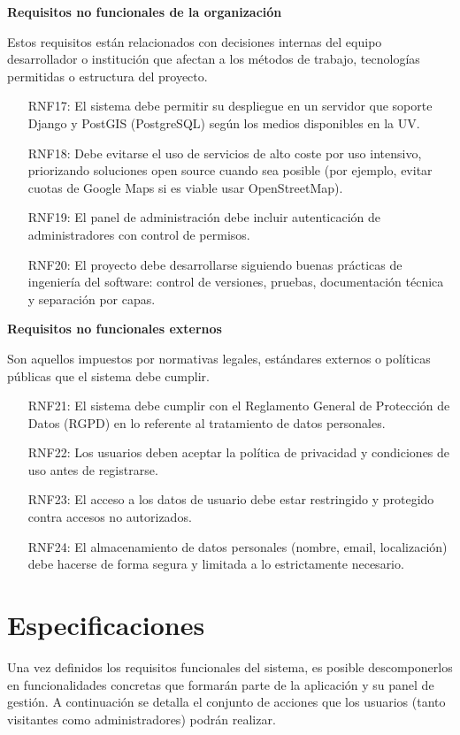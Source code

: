 \textbf{Requisitos no funcionales de la organización}

Estos requisitos están relacionados con decisiones internas del equipo desarrollador o institución que afectan a los métodos de trabajo, tecnologías permitidas o estructura del proyecto.

\begin{itemize}
    \item[RNF17:] El sistema debe permitir su despliegue en un servidor que soporte Django y PostGIS (PostgreSQL) según los medios disponibles en la UV.
    \item[RNF18:] Debe evitarse el uso de servicios de alto coste por uso intensivo, priorizando soluciones open source cuando sea posible (por ejemplo, evitar cuotas de Google Maps si es viable usar OpenStreetMap).
    \item[RNF19:] El panel de administración debe incluir autenticación de administradores con control de permisos.
    \item[RNF20:] El proyecto debe desarrollarse siguiendo buenas prácticas de ingeniería del software: control de versiones, pruebas, documentación técnica y separación por capas.
\end{itemize}

\textbf{Requisitos no funcionales externos}

Son aquellos impuestos por normativas legales, estándares externos o políticas públicas que el sistema debe cumplir.

\begin{itemize}
    \item[RNF21:] El sistema debe cumplir con el Reglamento General de Protección de Datos (RGPD) en lo referente al tratamiento de datos personales.
    \item[RNF22:] Los usuarios deben aceptar la política de privacidad y condiciones de uso antes de registrarse.
    \item[RNF23:] El acceso a los datos de usuario debe estar restringido y protegido contra accesos no autorizados.
    \item[RNF24:] El almacenamiento de datos personales (nombre, email, localización) debe hacerse de forma segura y limitada a lo estrictamente necesario.
\end{itemize}

\section{Especificaciones}
Una vez definidos los requisitos funcionales del sistema, es posible descomponerlos en funcionalidades concretas que formarán parte de la aplicación y su panel de gestión. A continuación se detalla el conjunto de acciones que los usuarios (tanto visitantes como administradores) podrán realizar.

